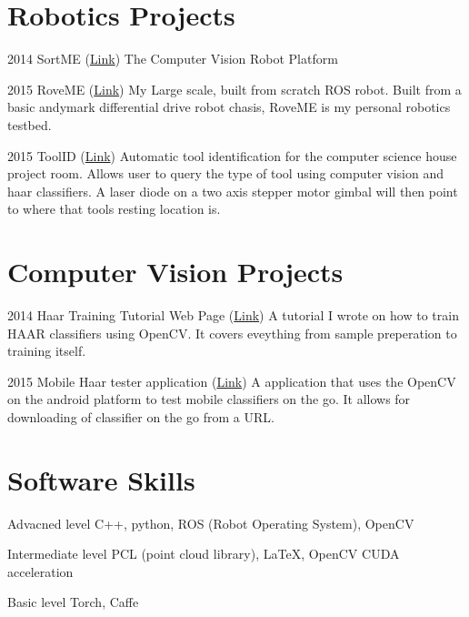\documentclass{tccv}
\begin{document}
\section{Robotics Projects}

\begin{yearlist}

\item{2014}
     {SortME (\href{http://www.trevorsherrard.com/SortME.html}{Link})}
     {The Computer Vision Robot Platform}
     
\item{2015}
     {RoveME (\href{http://www.trevorsherrard.com/RoveME.html}{Link})}
     {My Large scale, built from scratch ROS robot. Built from a basic andymark differential drive robot chasis, RoveME is my personal robotics testbed.}
     
\item{2015}
	{ToolID (\href{http://www.trevorsherrard.com/ToolID.html}
	{Link})}
	{Automatic tool identification for the computer science house project room. Allows user to query the type of tool using computer vision and haar classifiers. A laser diode on a two axis stepper motor gimbal will then point to where that tools resting location is.}

\end{yearlist}


\section{Computer Vision Projects}

\begin{yearlist}

\item{2014}
     {Haar Training Tutorial Web Page (\href{http://www.trevorsherrard.com/SortME.html}{Link})}
     {A tutorial I wrote on how to train HAAR classifiers using OpenCV. It covers eveything from sample preperation to training itself.}
     
\item{2015}
     {Mobile Haar tester application (\href{http://www.trevorsherrard.com/ComputerVision.html}{Link})}
     {A application that uses the OpenCV on the android platform to test mobile classifiers on the go. It allows for downloading of classifier on the go from a URL.}

\end{yearlist}


\section{Software Skills}
\begin{factlist}

\item{Advacned  level}
     {C++, python, ROS (Robot Operating System), OpenCV}

\item{Intermediate level}
     {PCL (point cloud library), \LaTeX, OpenCV CUDA acceleration}

\item{Basic level}
     {Torch, Caffe}

\end{factlist}
\end{document}
